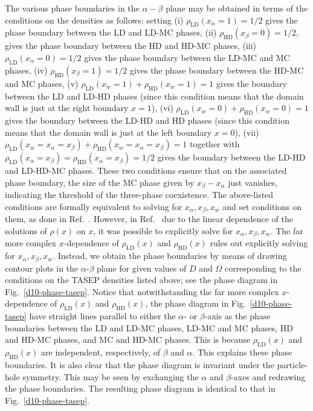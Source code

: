 \documentclass[aps,pre,twocolumn,superscriptaddress,amsmath,amssymb,longbibliography,floatfix]{revtex4}
\begin{document}
{The various phase boundaries in the $\alpha-\beta$ plane may be obtained in terms of the conditions on the densities as follows: setting (i) $\rho_\text{LD}(x_\alpha=1)=1/2$ gives the phase boundary between the LD and LD-MC phases, (ii) $\rho_\text{HD}(x_\beta=0)=1/2$, gives the phase boundary between the HD and HD-MC phases, (iii) $\rho_\text{LD}(x_\alpha=0)=1/2$ gives the phase boundary between the LD-MC and MC phases, (iv) $\rho_\text{HD}(x_\beta=1)=1/2$ gives the phase boundary between the HD-MC and MC phases, (v) $\rho_\text{LD}(x_w=1)+\rho_\text{HD}(x_w=1)=1$ gives the boundary between the LD and LD-HD phases (since this condition means that the domain wall is just at the right boundary $x=1$), (vi) $\rho_\text{LD}(x_w=0)+\rho_\text{HD}(x_w=0)=1$ gives the boundary between the LD-HD and HD phases (since this condition means that the domain wall is just at the left boundary $x=0$), (vii)  $\rho_\text{LD}(x_w=x_\alpha=x_\beta)+\rho_\text{HD}(x_w=x_\alpha=x_\beta)=1$ together with $\rho_\text{LD}(x_\alpha=x_\beta)=\rho_\text{HD}(x_\alpha=x_\beta)=1/2$ gives the boundary between the LD-HD and LD-HD-MC phases. These two conditions ensure that on the associated phase boundary, the size of the MC phase given by $x_\beta-x_\alpha$ just vanishes, indicating the threshold of the three-phase coexistence. The above-listed conditions are formally equivalent to solving for $x_\alpha,x_\beta,x_w$ and set conditions on them, as done in Ref.~\cite{frey-lktasep}. However, in Ref.~\cite{frey-lktasep} due to the linear dependence of the solutions of $\rho(x)$ on $x$, it was possible to explicitly solve for $x_\alpha,x_\beta,x_w$. The far more complex $x$-dependence of $\rho_\text{LD}(x)$ and $\rho_\text{HD}(x)$ rules out explicitly solving for $x_\alpha,x_\beta,x_w$. Instead, we obtain the phase boundaries by means of drawing contour plots in the  $\alpha$-$\beta$ plane for given values of $D$ and $\Omega$ corresponding to the conditions on the TASEP densities listed above; see the phase diagram in Fig.~\ref{d10-phase-tasep}. Notice that notwithstanding the far more complex $x$-dependence of $\rho_\text{LD}(x)$ and $\rho_\text{HD}(x)$, the phase diagram in Fig.~\ref{d10-phase-tasep} have straight lines parallel to either the $\alpha$- or $\beta$-axis as the phase boundaries between the LD and LD-MC phases, LD-MC and MC phases, HD and HD-MC phases, and MC and HD-MC phases. This is because $\rho_\text{LD}(x)$ and $\rho_\text{HD}(x)$ are independent, respectively, of $\beta$ and $\alpha$. This explains these phase boundaries. It is also clear that the phase diagram is invariant under the particle-hole symmetry. This may be seen by exchanging the $\alpha$ and $\beta$-axes and redrawing the phase boundaries. The resulting phase diagram is identical to that in Fig.~\ref{d10-phase-tasep}.

}
\end{document}
